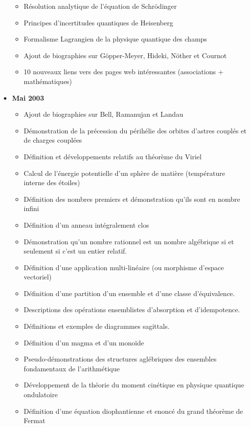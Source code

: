 \documentclass[12pt,a4paper,twoside,openright]{report}
\theoremstyle{definition}
\theoremstyle{itexmp}
\numberwithin{equation}{section}
\begin{document}
\begin{itemize}
\begin{itemize}[noitemsep]
				\item Résolution analytique de l'équation de Schrödinger
				\item Principes d'incertitudes quantiques de Heisenberg
				\item Formalisme Lagrangien de la physique quantique des champs
				\item Ajout de biographies sur Göpper-Meyer, Hideki, Nöther et Cournot 
				\item 10 nouveaux liens vers des pages web intéressantes (associations + mathématiques)
			\end{itemize}
		\item \textbf{Mai 2003}
			\begin{itemize}[noitemsep]
				\item Ajout de biographies sur Bell, Ramanujan et Landau 
				\item Démonstration de la précession du périhélie des orbites d'astres couplés et de charges couplées
				\item Définition et développements relatifs au théorème du Viriel
				\item Calcul de l'énergie potentielle d'un sphère de matière (température interne des étoiles)
				\item Définition des nombres premiers et démonstration qu'ils sont en nombre infini 
				\item Définition d'un anneau intégralement clos
				\item Démonstration qu'un nombre rationnel est un nombre algébrique si et seulement si c'est un entier relatif. 
				\item Définition d'une application multi-linéaire (ou morphisme d'espace vectoriel) 
				\item Définition d'une partition d'un ensemble et d'une classe d'équivalence. 
				\item Descriptions des opérations ensemblistes d'absorption et d'idempotence. 
				\item Définitions et exemples de diagrammes sagittals.
				\item Définition d'un magma et d'un monoïde
				\item Pseudo-démonstrations des structures aglébriques des ensembles fondamentaux de l'arithmétique
				\item Développement de la théorie du moment cinétique en physique quantique ondulatoire
				\item Définition d'une équation diophantienne et enoncé du grand théorème de Fermat
			\end{itemize}

\end{itemize}
\end{document}
